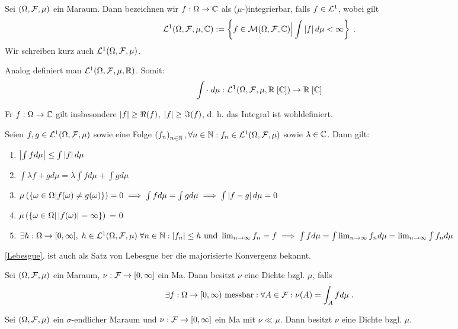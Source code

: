 \begin{definition}
		\label{integrierbare_funkt}
		Sei \((\Omega, \mathcal{F}, \mu)\) ein Ma\s raum. Dann bezeichnen wir $f: \Omega \to \mathbb{C}$ als ($\mu$-)integrierbar, falls $f\in \mathcal{L}^1$, wobei gilt
		\[\mathcal{L}^1(\Omega, \mathcal{F}, \mu, \mathbb{C}) := \left\{f\in \mathcal{M}(\Omega,\mathcal{F}, \mathbb{C})\Big\vert \int \left\lvert f \right\rvert d\mu < \infty\right\}\;.\]
		Wir schreiben kurz auch \(\mathcal{L}^1(\Omega, \mathcal{F}, \mu)\).
\end{definition}
\begin{rem}
	Analog definiert man \(\mathcal{L}^1(\Omega, \mathcal{F}, \mu, \mathbb{R})\). Somit:
	\[\int \cdot \;d\mu : \mathcal{L}^1(\Omega, \mathcal{F}, \mu, \mathbb{R}\;[\mathbb{C}]) \to \mathbb{R} \;[\mathbb{C}]\]
\end{rem}
\begin{rem}
	F\us r \(f:\Omega \to \mathbb{C}\) gilt insbesondere \(\left\lvert f \right\rvert \geq \Re(f)\), \(\left\lvert f \right\rvert \geq \Im(f)\), d. h. das Integral ist wohldefiniert.
\end{rem}
\begin{theorem}
	Seien \(f,g\in \mathcal{\mathcal{L}}^1(\Omega, \mathcal{F}, \mu)\) sowie eine Folge \(\left (f_n\right )_{n\in \mathbb{N}}, \forall n \in \mathbb{N} :f_n \in \mathcal{L}^1(\Omega, \mathcal{F}, \mu)\) sowie \(\lambda \in \mathbb{C}\). Dann gilt:
	\begin{enumerate}
		\item \(\left\lvert \int f d\mu \right\rvert \leq \int \left\lvert f \right\rvert d\mu\)
		\item \(\int \lambda f + g d \mu = \lambda \int f d \mu + \int g d \mu\)
		\item \(\mu\left(\left\{\omega\in \Omega\vert f(\omega) \neq g(\omega)\right\}\right) = 0 \implies \int f d\mu = \int g d \mu \implies \int \left\lvert f-g \right\rvert d \mu = 0\)
		\item \(\mu\left(\left\{\omega\in \Omega\vert \left\lvert f(\omega) \right\rvert = \infty\right\}\right)\) = 0
		\item \(\exists h: \Omega \to [0,\infty],\; h \in \mathcal{L}^1(\Omega, \mathcal{F},\mu)\; \forall n \in \mathbb{N}: \left\lvert f_n \right\rvert \leq h \text{ und } \lim_{n \to \infty} f_n = f \implies \int f d \mu = \int \lim_{n \to \infty} f_n d \mu = \lim_{n \to\infty} \int f_n d\mu\) \label{Lebesgue}
	\end{enumerate}
\end{theorem}
\begin{rem}
	\ref{Lebesgue}. ist auch als Satz von Lebesgue \us ber die majorisierte Konvergenz bekannt.
\end{rem}
\begin{definition}
	Sei \((\Omega, \mathcal{F}, \mu)\) ein Ma\s raum, \(\nu: \mathcal{F} \to [0,\infty]\) ein Ma\s{}. Dann besitzt $\nu$ eine Dichte bzgl. $\mu$, falls
	\[\exists f:\Omega \to [0,\infty) \text{ messbar}: \forall A \in \mathcal{F}: \nu(A) = \int_A f d\mu\;.\]
\end{definition}
\begin{theorem} Sei \((\Omega, \mathcal{F}, \mu)\) ein $\sigma$-endlicher Ma\s raum und \(\nu: \mathcal{F} \to [0,\infty]\) ein Ma\s{} mit \(\nu \ll\mu\). Dann besitzt \(\nu\) eine Dichte bzgl. $\mu$.
\end{theorem}

